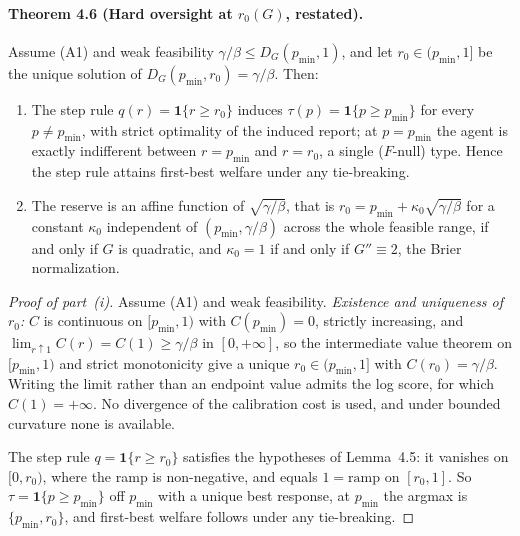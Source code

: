 \documentclass[acmsmall,nonacm,screen]{acmart}
\theoremstyle{acmplain}%
\theoremstyle{acmdefinition}%
\numberwithin{equation}{section}
\begin{document}
\begin{appendix}
\paragraph*{Theorem 4.6 (Hard oversight at $r_0(G)$, restated).}
Assume (A1) and weak feasibility $\gamma/\beta \le D_G(p_{\min},1)$, and let $r_0 \in (p_{\min},1]$ be the unique solution of $D_G(p_{\min},r_0) = \gamma/\beta$. Then:
\begin{enumerate}
\item[(i)] The step rule $q(r) = \mathbf 1\{r \ge r_0\}$ induces $\tau(p) = \mathbf 1\{p \ge p_{\min}\}$ for every $p \ne p_{\min}$, with strict optimality of the induced report; at $p = p_{\min}$ the agent is exactly indifferent between $r = p_{\min}$ and $r = r_0$, a single ($F$-null) type. Hence the step rule attains first-best welfare under any tie-breaking.
\item[(ii)] The reserve is an affine function of $\sqrt{\gamma/\beta}$, that is $r_0 = p_{\min} + \kappa_0\sqrt{\gamma/\beta}$ for a constant $\kappa_0$ independent of $(p_{\min},\gamma/\beta)$ across the whole feasible range, if and only if $G$ is quadratic, and $\kappa_0 = 1$ if and only if $G'' \equiv 2$, the Brier normalization.
\end{enumerate}

\begin{proof}[Proof of part~(i)]
Assume (A1) and weak feasibility. \emph{Existence and uniqueness of $r_0$:} $C$ is continuous on $[p_{\min},1)$ with $C(p_{\min})=0$, strictly increasing, and $\lim_{r\uparrow1}C(r)=C(1)\geq\gamma/\beta$ in $[0,+\infty]$, so the intermediate value theorem on $[p_{\min},1)$ and strict monotonicity give a unique $r_0\in(p_{\min},1]$ with $C(r_0)=\gamma/\beta$. Writing the limit rather than an endpoint value admits the log score, for which $C(1)=+\infty$. No divergence of the calibration cost is used, and under bounded curvature none is available.

The step rule $q = \mathbf 1\{r \ge r_0\}$ satisfies the hypotheses of Lemma~4.5: it vanishes on $[0,r_0)$, where the ramp is non-negative, and equals $1 = \mathrm{ramp}$ on $[r_0,1]$. So $\tau = \mathbf 1\{p \ge p_{\min}\}$ off $p_{\min}$ with a unique best response, at $p_{\min}$ the argmax is $\{p_{\min},r_0\}$, and first-best welfare follows under any tie-breaking.
\end{proof}


\end{appendix}
\end{document}
